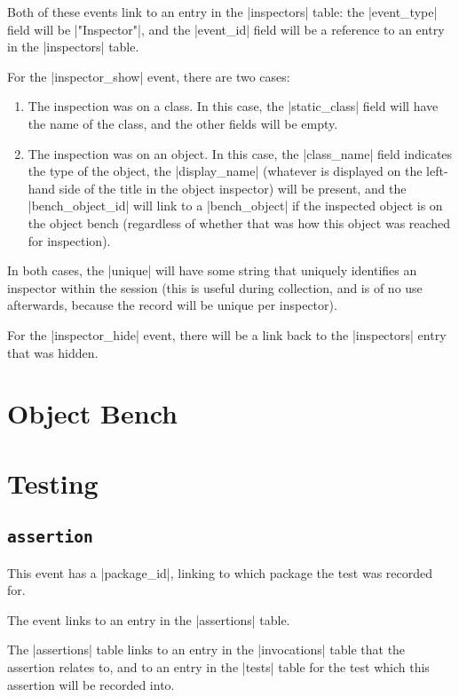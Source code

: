 \documentclass{book}
\begin{document}
Both of these events link to an entry in the |inspectors| table: the
|event_type| field will be |"Inspector"|, and the |event_id| field will be a
reference to an entry in the |inspectors| table.

For the |inspector_show| event, there are two cases:

\begin{enumerate}
\item The inspection was on a class.  In this case, the |static_class| field
  will have the name of the class, and the other fields will be empty.
\item The inspection was on an object.  In this case, the |class_name| field
  indicates the type of the object, the |display_name| (whatever is displayed
  on the left-hand side of the title in the object inspector) will be present,
  and the |bench_object_id| will link to a |bench_object| if the inspected
  object is on the object bench (regardless of whether that was how this
  object was reached for inspection).
\end{enumerate}

In both cases, the |unique| will have some string that uniquely identifies an
inspector within the session (this is useful during collection, and is of no
use afterwards, because the record will be unique per inspector).

For the |inspector_hide| event, there will be a link back to the |inspectors|
entry that was hidden.

\section{Object Bench}

\section{Testing}

\subsection{\lstinline|assertion|}

This event has a |package_id|, linking to which package the test was
recorded for.

The event links to an entry in the |assertions| table.


The |assertions| table links to an entry in the |invocations| table that the assertion
relates to, and to an entry in the |tests| table for the test which
this assertion will be recorded into.
\end{document}
